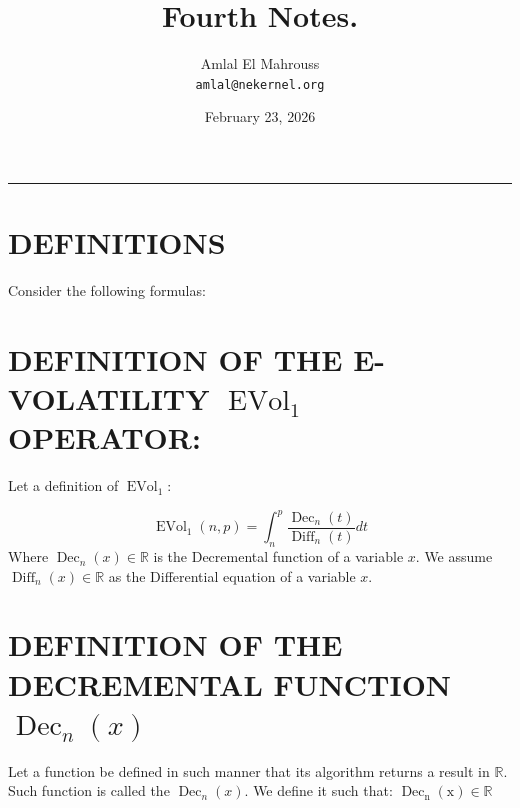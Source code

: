 \documentclass[11pt, a4paper]{article}
\title{Fourth Notes.}
\author{Amlal El Mahrouss\\\texttt{amlal@nekernel.org}}
\date{February 23, 2026}
\begin{document}
\maketitle

\begin{center}
	\rule[0.01cm]{17cm}{0.01cm}
\end{center}

\section{DEFINITIONS}

Consider the following formulas: 

\section{DEFINITION OF THE E-VOLATILITY $\operatorname{EVol}_{1}$ OPERATOR:}

Let a definition of $\operatorname{EVol}_{1}$:

\begin{equation}
    \operatorname{EVol}_{1}(n, p) = \int_{n}^{p} \frac{\operatorname{Dec}_{n}(t)}{\operatorname{Diff}_{n}(t)}dt
\end{equation}
Where $\operatorname{Dec}_{n}(x) \in \mathbb{R}$ is the Decremental function of a variable $x$. We assume $\operatorname{Diff}_{n}(x) \in \mathbb{R}$ as the Differential equation of a variable $x$.

\section{DEFINITION OF THE DECREMENTAL FUNCTION $\operatorname{Dec}_{n}(x)$}

Let a function be defined in such manner that its algorithm returns a result in $\mathbb{R}$. Such function is called the $\operatorname{Dec}_{n}(x)$. We define it such that: $ \operatorname{\operatorname{Dec}_{n}(x)} \in \mathbb{R}$
\end{document}
